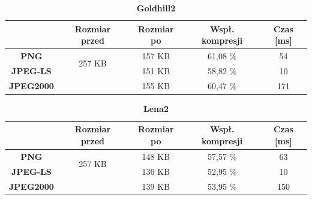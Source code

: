 \begin{table}[!h]
	\centering
	\caption{\textbf{Goldhill2}}
	\label{my-label}
	\begin{tabular}{|c|c|c|c|c|}                                             
		\hline
		& \textbf{Rozmiar przed} & \textbf{Rozmiar po} & \textbf{Wspł. kompresji} & \textbf{Czas {[}ms{]}} \\ \hline 
		\textbf{PNG}      &          \multicolumn{1}{c|}{\multirow{2}{*}{257 KB}}             &        157 KB             &      61,08 \%                   &               54              \\\cline{3-5}
		\textbf{JPEG-LS}  &                        &       151 KB              &         58,82 \%                &            10              \\\cline{3-5}
		\textbf{JPEG2000} &                        &       155 KB              &         60,47 \%                &       171               \\ \hline
	\end{tabular}
\end{table}

\begin{table}[!h]
	\centering
	\caption{\textbf{Lena2}}
	\label{my-label}
	\begin{tabular}{|c|c|c|c|c|}                                             
		\hline
		& \textbf{Rozmiar przed} & \textbf{Rozmiar po} & \textbf{Wspł. kompresji} & \textbf{Czas {[}ms{]}} \\ \hline 
		\textbf{PNG}      &          \multicolumn{1}{c|}{\multirow{2}{*}{257 KB}}             &      148 KB               &       57,57 \%                  &           63                   \\\cline{3-5}
		\textbf{JPEG-LS}  &                        &        136 KB             &         52,95 \%                &       10                   \\\cline{3-5}
		\textbf{JPEG2000} &                        &      139 KB               &          53,95 \%               &       150               \\ \hline
	\end{tabular}
\end{table}


